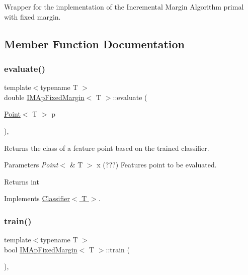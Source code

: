 Wrapper for the implementation of the Incremental Margin Algorithm primal with fixed margin. 

\subsection{Member Function Documentation}
\mbox{\label{class_i_m_ap_fixed_margin_a909eb58c78c20780494598b478f8846f}} 
\subsubsection{\texorpdfstring{evaluate()}{evaluate()}}
{\footnotesize\ttfamily template$<$typename T $>$ \\
double \hyperlink{class_i_m_ap_fixed_margin}{I\+M\+Ap\+Fixed\+Margin}$<$ T $>$\+::evaluate (\begin{DoxyParamCaption}\item[{\hyperlink{class_point}{Point}$<$ T $>$}]{p }\end{DoxyParamCaption})\hspace{0.3cm}{\ttfamily [override]}, {\ttfamily [virtual]}}



Returns the class of a feature point based on the trained classifier. 


\begin{DoxyParams}{Parameters}
{\em Point$<$} & T $>$ x (???) Features point to be evaluated. \\
\hline
\end{DoxyParams}
\begin{DoxyReturn}{Returns}
int 
\end{DoxyReturn}


Implements \hyperlink{class_classifier_ab3b9544a8d9c3cbde8d5865c7e9be0fb}{Classifier$<$ T $>$}.

\mbox{\label{class_i_m_ap_fixed_margin_a4d99742be5fe5a21b8ae6f99547a98c8}} 
\subsubsection{\texorpdfstring{train()}{train()}}
{\footnotesize\ttfamily template$<$typename T $>$ \\
bool \hyperlink{class_i_m_ap_fixed_margin}{I\+M\+Ap\+Fixed\+Margin}$<$ T $>$\+::train (\begin{DoxyParamCaption}{ }\end{DoxyParamCaption})\hspace{0.3cm}{\ttfamily [override]}, {\ttfamily [virtual]}}



